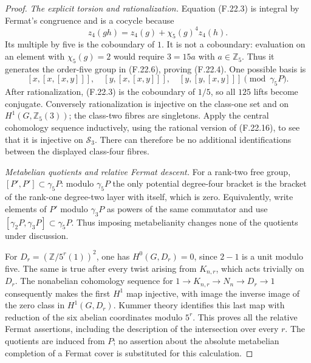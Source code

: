 \begin{proof}
\emph{The explicit torsion and rationalization.}
Equation (F.22.3) is integral by Fermat's congruence
and is a cocycle because
\[
 z_4(gh)=z_4(g)+\chi_5(g)^4z_4(h).
\]
Its multiple by five is the coboundary of \(1\).
It is not a coboundary: evaluation on an element with
\(\chi_5(g)=2\) would require \(3=15a\) with
\(a\in\mathbb Z_5\). Thus it generates the order-five
group in (F.22.6), proving (F.22.4).
One possible basis is
\[
 [x,[x,[x,y]]],\quad [y,[x,[x,y]]],\quad
 [y,[y,[x,y]]]\pmod{\gamma_5P}.
\]
After rationalization, (F.22.3) is the coboundary of
\(1/5\), so all \(125\) lifts become conjugate.
Conversely rationalization is injective on the
class-one set and on \(H^1(G,\mathbb Z_5(3))\); the
class-two fibres are singletons. Apply the central
cohomology sequence inductively, using the rational
version of (F.22.16), to see that it is injective on
\(\mathcal S_3\). There can therefore be no additional
identifications between the displayed class-four fibres.

\emph{Metabelian quotients and relative Fermat descent.}
For a rank-two free group,
\([P',P']\subset\gamma_5P\): modulo \(\gamma_5P\) the
only potential degree-four bracket is the bracket of
the rank-one degree-two layer with itself, which is
zero. Equivalently, write elements of \(P'\) modulo
\(\gamma_3P\) as powers of the same commutator and use
\([\gamma_2P,\gamma_3P]\subset\gamma_5P\).
Thus imposing metabelianity changes none of the
quotients under discussion.

For \(D_r=(\mathbb Z/5^r(1))^2\), one has
\(H^0(G,D_r)=0\), since \(2-1\) is a unit modulo five.
The same is true after every twist arising from
\(K_{n,r}\), which acts trivially on \(D_r\).
The nonabelian cohomology sequence for
\(1\to K_{n,r}\to N_n\to D_r\to1\) consequently makes
the first \(H^1\) map injective, with image the inverse
image of the zero class in \(H^1(G,D_r)\).
Kummer theory identifies this last map with reduction
of the six abelian coordinates modulo \(5^r\).
This proves all the relative Fermat assertions, including
the description of the intersection over every \(r\).
The quotients are induced from \(P\); no assertion about
the absolute metabelian completion of a Fermat cover
is substituted for this calculation.


\end{proof}
